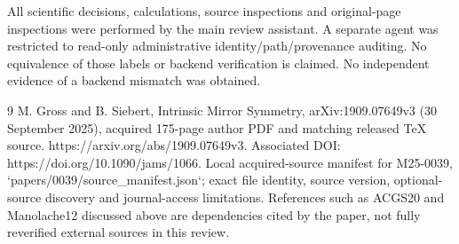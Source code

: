 \documentclass[10pt]{article}
\begin{document}
All scientific decisions, calculations, source inspections and original-page inspections were performed by the main review assistant. A separate agent was restricted to read-only administrative identity/path/provenance auditing. No equivalence of those labels or backend verification is claimed. No independent evidence of a backend mismatch was obtained.\par
9 M. Gross and B. Siebert, Intrinsic Mirror Symmetry, arXiv:1909.07649v3 (30 September 2025), acquired 175-page author PDF and matching released TeX source. https://arxiv.org/abs/1909.07649v3. Associated DOI: https://doi.org/10.1090/jams/1066. Local acquired-source manifest for M25-0039, `papers/0039/source\_manifest.json`; exact file identity, source version, optional-source discovery and journal-access limitations. References such as ACGS20 and Manolache12 discussed above are dependencies cited by the paper, not fully reverified external sources in this review.\par
\end{document}
